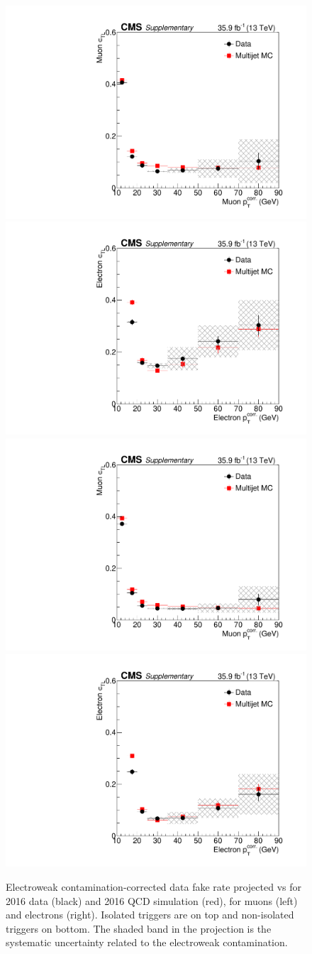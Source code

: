 \begin{figure}[!hbtp]
  \centering
  \includegraphics[width=.45\textwidth]{figs/ssan/fakerate/derivation/y2016/y2016_mu_1dfr_cone_LooseEMVA_IsoTrigs.pdf}
  \includegraphics[width=.45\textwidth]{figs/ssan/fakerate/derivation/y2016/y2016_el_1dfr_cone_LooseEMVA_IsoTrigs.pdf} \\
  \includegraphics[width=.45\textwidth]{figs/ssan/fakerate/derivation/y2016/y2016_mu_1dfr_cone_LooseEMVA.pdf}
  \includegraphics[width=.45\textwidth]{figs/ssan/fakerate/derivation/y2016/y2016_el_1dfr_cone_LooseEMVA.pdf}
  \caption{Electroweak contamination-corrected data fake rate projected vs \pt for 2016 data (black) and 2016 QCD simulation (red),
   for muons (left) and electrons (right). Isolated triggers are on top and non-isolated triggers on bottom.
      The shaded band in the projection is the systematic uncertainty related to the electroweak contamination.}
  \label{fig:QCDFRMuEle2016isoandnoniso}
  \end{figure}
